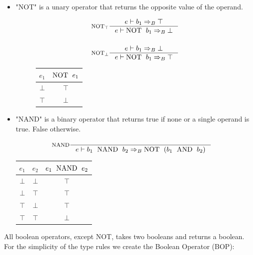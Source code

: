 \begin{itemize}
\item "NOT" is a unary operator that returns the opposite value of the operand.

\begin{figure}[H]
\centering
\begin{minipage}[c]{0.45\linewidth}
\centering
\begin{align*}
&\inference[$\text{NOT}_\top$]{e \vdash b_1 \Rightarrow_B \top}
                       {e \vdash \Tnot b_1 \Rightarrow_B \bot}
\\\\
&\inference[$\text{NOT}_\bot$]{e \vdash b_1 \Rightarrow_B \bot}
                       {e \vdash \Tnot b_1 \Rightarrow_B \top}
\end{align*}
\end{minipage}
\quad
\begin{minipage}[c]{0.45\linewidth}
\centering
\begin{tabular}{ | c | c | }
\hline
$e_1$ & $ \text{NOT \;} e_1$ \\\hline
$\bot$ & $\top$ \\\hline
$\top$ & $\bot$ \\\hline
\end{tabular}
\end{minipage}
\end{figure}

\item "NAND" is a binary operator that returns true if none or a single operand is true. False otherwise.

\begin{align*}
&\inference[NAND]{}
                   {e \vdash b_1 \Tnand b_2 \Rightarrow_B \Tnot( b_1 \Tand b_2 )}
\end{align*}

\begin{center}
\begin{tabular}{ | c | c | c | }
\hline
$e_1$ & $e_2$ & $e_1 \text{\; NAND \;} e_2$ \\\hline
$\bot$ & $\bot$ & $\top$ \\\hline
$\bot$ & $\top$ & $\top$ \\\hline
$\top$ & $\bot$ & $\top$ \\\hline
$\top$ & $\top$ & $\bot$ \\\hline
\end{tabular}
\end{center}
\end{itemize}

All boolean operators, except NOT, takes two booleans and returns a boolean. For the simplicity of the type rules we create the Boolean Operator (BOP):

